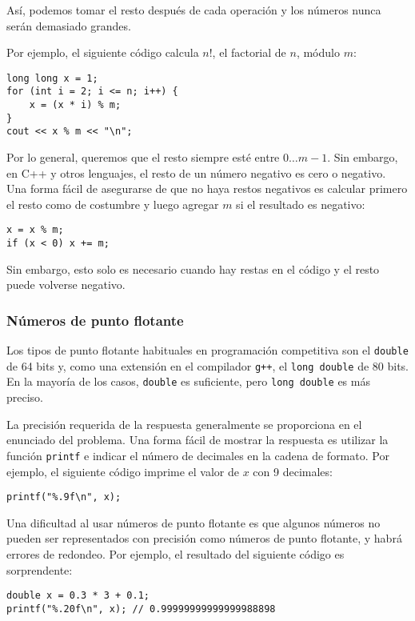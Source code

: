 Así, podemos tomar el resto después de cada operación
y los números nunca serán demasiado grandes.

Por ejemplo, el siguiente código calcula $n!$,
el factorial de $n$, módulo $m$:
\begin{lstlisting}
long long x = 1;
for (int i = 2; i <= n; i++) {
    x = (x * i) % m;
}
cout << x % m << "\n";
\end{lstlisting}

Por lo general, queremos que el resto siempre
esté entre $0\ldots m-1$.
Sin embargo, en C++ y otros lenguajes,
el resto de un número negativo
es cero o negativo.
Una forma fácil de asegurarse de que no haya
restos negativos es calcular primero
el resto como de costumbre y luego agregar $m$
si el resultado es negativo:
\begin{lstlisting}
x = x % m;
if (x < 0) x += m;
\end{lstlisting}
Sin embargo, esto solo es necesario cuando hay
restas en el código y el
resto puede volverse negativo.

\subsubsection{Números de punto flotante}


Los tipos de punto flotante habituales en
programación competitiva son
el \texttt{double} de 64 bits
y, como una extensión en el compilador \texttt{g++},
el \texttt{long double} de 80 bits.
En la mayoría de los casos, \texttt{double} es suficiente,
pero \texttt{long double} es más preciso.

La precisión requerida de la respuesta
generalmente se proporciona en el enunciado del problema.
Una forma fácil de mostrar la respuesta es utilizar
la función \texttt{printf}
e indicar el número de decimales
en la cadena de formato.
Por ejemplo, el siguiente código imprime
el valor de $x$ con 9 decimales:

\begin{lstlisting}
printf("%.9f\n", x);
\end{lstlisting}

Una dificultad al usar números de punto flotante
es que algunos números no pueden ser representados
con precisión como números de punto flotante,
y habrá errores de redondeo.
Por ejemplo, el resultado del siguiente código
es sorprendente:

\begin{lstlisting}
double x = 0.3 * 3 + 0.1;
printf("%.20f\n", x); // 0.99999999999999988898
\end{lstlisting}


